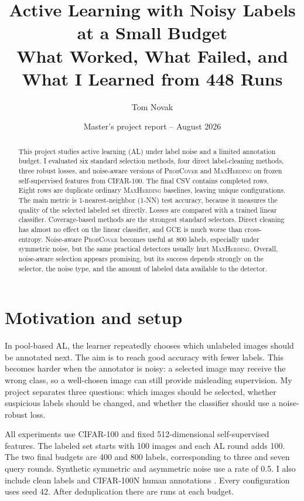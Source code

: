 \documentclass[10pt,twocolumn]{article}
\title{Active Learning with Noisy Labels at a Small Budget\\
\large What Worked, What Failed, and What I Learned from 448 Runs}
\author{Tom Novak}
\date{Master's project report -- August 2026}
\newcommand{\pc}{\textnormal{\textsc{ProbCover}}}
\newcommand{\mh}{\textnormal{\textsc{MaxHerding}}}
\newcommand{\gce}{\textnormal{\textsc{GCE}}}
\newcommand{\dataset}{\textnormal{\textsc{CIFAR-100}}}
\begin{document}
\maketitle
\vspace{-1.0em}

\begin{abstract}
This project studies active learning (AL) under label noise and a limited
annotation budget. I evaluated six standard selection methods, four
direct label-cleaning methods, three robust losses, and noise-aware versions of
\pc{} and \mh{} on frozen self-supervised features from \dataset{}. The final
CSV contains \RawRuns{} completed rows. Eight rows are duplicate ordinary
\mh{} baselines, leaving \UniqueRuns{} unique configurations. The main metric
is 1-nearest-neighbor (1-NN) test accuracy, because it measures the quality of
the selected labeled set directly. Losses are compared with a trained linear
classifier. Coverage-based methods are the strongest standard selectors. Direct
cleaning has almost no effect on the linear classifier, and \gce{} is much
worse than cross-entropy. Noise-aware \pc{} becomes useful at 800 labels,
especially under symmetric noise, but the same practical detectors usually
hurt \mh{}. Overall, noise-aware selection appears promising, but its success
depends strongly on the selector, the noise type, and the amount of labeled
data available to the detector.
\end{abstract}

\section{Motivation and setup}

In pool-based AL, the learner repeatedly chooses which unlabeled images should
be annotated next. The aim is to reach good accuracy with fewer labels.
This becomes harder when the annotator is noisy: a selected image may receive
the wrong class, so a well-chosen image can still provide misleading
supervision. My project separates three questions: which images should be
selected, whether suspicious labels should be changed, and whether the
classifier should use a noise-robust loss.

All experiments use \dataset{} and fixed 512-dimensional self-supervised
features. The labeled set starts with 100 images and each AL round adds 100.
The two final budgets are 400 and 800 labels, corresponding to three and seven
query rounds. Synthetic symmetric and asymmetric noise use a rate of 0.5. I
also include clean labels and CIFAR-100N human annotations
\cite{wei2022cifarn}. Every configuration uses seed 42. After deduplication
there are \RunsPerBudget{} runs at each budget.
\end{document}
